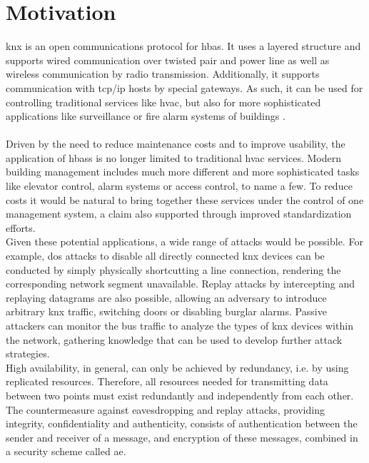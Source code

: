 \section{Motivation}

\gls{knx} is an open communications protocol for \gls{hbas}.
It uses a layered structure and supports wired communication over twisted pair
and power line as well as wireless communication by radio transmission. 
Additionally, it supports communication with \gls{tcp}/\gls{ip} hosts by special gateways. 
As such, it can be used for controlling traditional services like \gls{hvac}, but also for more
sophisticated applications like surveillance or fire alarm systems of buildings \cite{knxapps}.
\\
\\
Driven by the need to reduce maintenance costs and to improve usability, the application of \glspl{hbas} is no longer limited to traditional \gls{hvac} services.
Modern building management includes much more different and more sophisticated tasks like elevator control, alarm systems or access control, to name a few.
To reduce costs it would be natural to bring together these services under the control of one management system, a claim also supported through improved 
standardization efforts.
\\
Given these potential applications, a wide range of attacks would be possible. For example, \gls{dos} attacks to disable all directly connected
\gls{knx} devices can be conducted by simply physically shortcutting a line
connection, rendering the corresponding network segment unavailable.
Replay attacks by intercepting and replaying datagrams are also possible, allowing an adversary to introduce arbitrary \gls{knx} traffic, switching doors
or disabling burglar alarms. Passive attackers can monitor the bus traffic to analyze the types of \gls{knx} devices within the network, gathering knowledge that can be used
to develop further attack strategies.
\\
High availability, in general, can only be achieved by redundancy, i.e. by using replicated resources. Therefore, all
resources needed for transmitting data between two points must exist redundantly and independently from each other.
\\
The countermeasure against eavesdropping and replay attacks, providing integrity, confidentiality and authenticity, consists of authentication
between the sender and receiver of a message, and encryption of these messages, combined in a security scheme called \gls{ae}.
